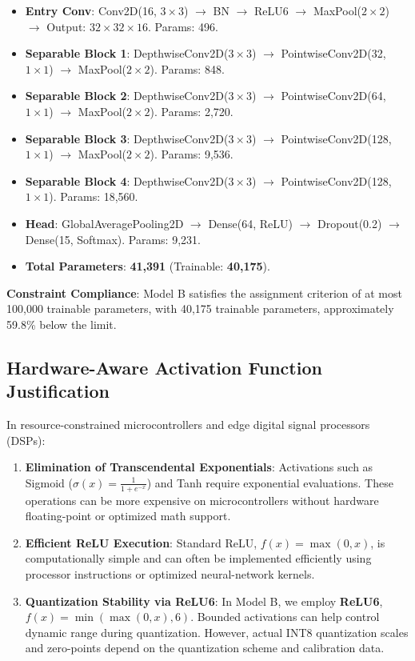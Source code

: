 \begin{itemize}
    \item \textbf{Entry Conv}: Conv2D(16, $3 \times 3$) $\rightarrow$ BN $\rightarrow$ ReLU6 $\rightarrow$ MaxPool($2 \times 2$) $\rightarrow$ Output: $32 \times 32 \times 16$. Params: 496.
    \item \textbf{Separable Block 1}: DepthwiseConv2D($3 \times 3$) $\rightarrow$ PointwiseConv2D(32, $1 \times 1$) $\rightarrow$ MaxPool($2 \times 2$). Params: 848.
    \item \textbf{Separable Block 2}: DepthwiseConv2D($3 \times 3$) $\rightarrow$ PointwiseConv2D(64, $1 \times 1$) $\rightarrow$ MaxPool($2 \times 2$). Params: 2,720.
    \item \textbf{Separable Block 3}: DepthwiseConv2D($3 \times 3$) $\rightarrow$ PointwiseConv2D(128, $1 \times 1$) $\rightarrow$ MaxPool($2 \times 2$). Params: 9,536.
    \item \textbf{Separable Block 4}: DepthwiseConv2D($3 \times 3$) $\rightarrow$ PointwiseConv2D(128, $1 \times 1$). Params: 18,560.
    \item \textbf{Head}: GlobalAveragePooling2D $\rightarrow$ Dense(64, ReLU) $\rightarrow$ Dropout(0.2) $\rightarrow$ Dense(15, Softmax). Params: 9,231.
    \item \textbf{Total Parameters}: \textbf{41,391} (Trainable: \textbf{40,175}).
\end{itemize}

\noindent\textbf{Constraint Compliance}: Model B satisfies the assignment criterion of at most 100,000 trainable parameters, with 40,175 trainable parameters, approximately 59.8\% below the limit.

\subsection{Hardware-Aware Activation Function Justification}

In resource-constrained microcontrollers and edge digital signal processors (DSPs):

\begin{enumerate}
    \item \textbf{Elimination of Transcendental Exponentials}: Activations such as Sigmoid ($\sigma(x)=\frac{1}{1+e^{-x}}$) and Tanh require exponential evaluations. These operations can be more expensive on microcontrollers without hardware floating-point or optimized math support.

    \item \textbf{Efficient ReLU Execution}: Standard ReLU, $f(x)=\max(0,x)$, is computationally simple and can often be implemented efficiently using processor instructions or optimized neural-network kernels.

    \item \textbf{Quantization Stability via ReLU6}: In Model B, we employ \textbf{ReLU6}, $f(x)=\min(\max(0,x),6)$. Bounded activations can help control dynamic range during quantization. However, actual INT8 quantization scales and zero-points depend on the quantization scheme and calibration data.
\end{enumerate}

